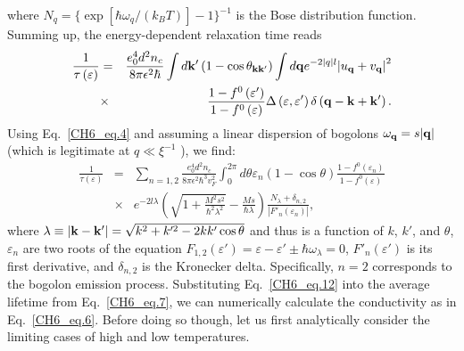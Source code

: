 %
where $N_q=\{\exp[\hbar\omega_q/(k_BT)]-1\}^{-1}$ is the Bose distribution function.
%
Summing up, the energy-dependent relaxation time reads
%
\begin{eqnarray}\label{CH6_eq.11}
\frac{1}{\tau\left(\varepsilon\right)} &=& \frac{e_0^4 d^2 n_c}{8 \pi\epsilon^2 \hbar} \int d \mathbf{k'}\left(1-\cos\theta_{\mathbf{kk'}}\right) \int d \mathbf{q} e^{-2\abs{q}l}\abs{u_\mathbf{q}+v_\mathbf{q}}^2 \nonumber \\
&\times& \frac{1-f^0\left(\varepsilon'\right)}{1-f^0\left(\varepsilon\right)}\Delta\left(\varepsilon,\varepsilon'\right)\delta \left(\mathbf{q}-\mathbf{k}+\mathbf{k'}\right).
\end{eqnarray}
%
Using Eq.~\eqref{CH6_eq.4} and assuming a linear dispersion of bogolons $\omega_\mathbf{q}=s\abs{\mathbf{q}}$ (which is legitimate at $q\ll \xi^{-1}$ ), we find:
%
\begin{eqnarray} \label{CH6_eq.12}
\frac{1}{\tau\left(\varepsilon\right)} &=& \sum_{n=1,2}\frac{e_0^4 d^2 n_c }{8\pi \epsilon^2 \hbar^3 v_F^2} \int_0^{2\pi} d\theta \varepsilon_n \left( 1-\cos\theta\right)  \frac{1-f^0\left(\varepsilon_n \right) } {1-f^0\left(\varepsilon\right)} \nonumber \\ 
&\times& e^{-2l\lambda}\left( \sqrt{1+\frac{M^2s^2}{\hbar^2\lambda^2}} - \frac{Ms}{\hbar \lambda}\right) \frac{N_\lambda + \delta_{n,2}}{|F'_n \left( \varepsilon_n \right) |} ,
\end{eqnarray}
%
where $\lambda\equiv\abs{\mathbf{k}-\mathbf{k'}} = \sqrt{k^2+k'^2-2kk'\cos\theta}$ and thus is a function of $k$, $k'$, and $\theta$, $\varepsilon_n$ are two roots of the equation $F_{1,2} \left(\varepsilon'\right)=\varepsilon-\varepsilon'\pm \hbar \omega_\lambda=0$, $F'_{n}\left(\varepsilon'\right)$ is its first derivative, and $\delta_{n,2}$ is the Kronecker delta. Specifically, $n=2$ corresponds to the bogolon emission process.
%
Substituting Eq.~\eqref{CH6_eq.12} into the average lifetime from Eq.~\eqref{CH6_eq.7}, we can numerically calculate the conductivity as in Eq.~\eqref{CH6_eq.6}. Before doing so though, let us first analytically consider the limiting cases of high and low temperatures.

%
%

